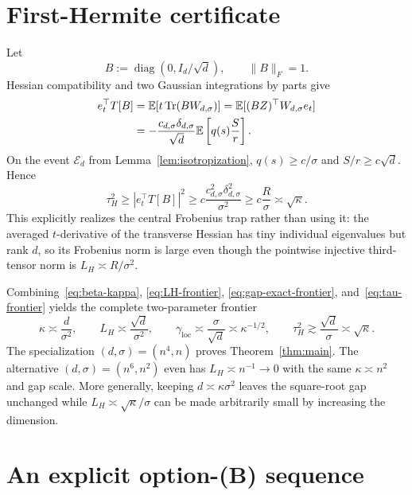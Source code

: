 \documentclass[11pt]{article}
\numberwithin{equation}{section}
\DeclareMathOperator{\Tr}{Tr}
\DeclareMathOperator{\diag}{diag}
\newcommand{\E}{\mathbb E}
\newcommand{\loc}{\mathrm{loc}}
\begin{document}
\section{First-Hermite certificate}\label{sec:tau}

Let
\begin{equation}\label{eq:Btest}
 B:=\diag(0,I_d/\sqrt d),\qquad \|B\|_F=1.
\end{equation}
Hessian compatibility and two Gaussian integrations by parts give
\begin{align}
 e_t^\top T[B]
 &=\E[t\Tr(BW_{d,\sigma})]
 =\E[(BZ)^\top W_{d,\sigma}e_t]\notag\\
 &=-\frac{c_{d,\sigma}\delta_{d,\sigma}}{\sqrt d}
 \E\left[q(s)\frac S r\right].\label{eq:T-certificate}
\end{align}
On the event $\mathcal E_d$ from Lemma~\ref{lem:isotropization},
$q(s)\ge c/\sigma$ and $S/r\ge c\sqrt d$.  Hence
\begin{equation}\label{eq:tau-frontier}
 \tau_H^2\ge|e_t^\top T[B]|^2
 \ge c\frac{c_{d,\sigma}^2\delta_{d,\sigma}^2}{\sigma^2}
 \ge c\frac R\sigma
 \asymp\sqrt\kappa.
\end{equation}
This explicitly realizes the central Frobenius trap rather than using it:
the averaged $t$-derivative of the transverse Hessian has tiny individual
eigenvalues but rank $d$, so its Frobenius norm is large even though the
pointwise injective third-tensor norm is $L_H\asymp R/\sigma^2$.

Combining~\eqref{eq:beta-kappa}, \eqref{eq:LH-frontier},
\eqref{eq:gap-exact-frontier}, and~\eqref{eq:tau-frontier} yields the complete
two-parameter frontier
\begin{equation}\label{eq:complete-frontier}
 \boxed{
 \kappa\asymp\frac d{\sigma^2},\qquad
 L_H\asymp\frac{\sqrt d}{\sigma^2},\qquad
 \gamma_{\loc}\asymp\frac\sigma{\sqrt d}\asymp\kappa^{-1/2},\qquad
 \tau_H^2\gtrsim\frac{\sqrt d}{\sigma}\asymp\sqrt\kappa.}
\end{equation}
The specialization $(d,\sigma)=(n^4,n)$ proves
Theorem~\ref{thm:main}.  The alternative $(d,\sigma)=(n^6,n^2)$ even has
$L_H\asymp n^{-1}\to0$ with the same $\kappa\asymp n^2$ and gap scale.
More generally, keeping
$d\asymp\kappa\sigma^2$ leaves the square-root gap unchanged while
$L_H\asymp\sqrt\kappa/\sigma$ can be made arbitrarily small by increasing
the dimension.

\section{An explicit option-(B) sequence}\label{sec:explicit-sequence}
\end{document}

